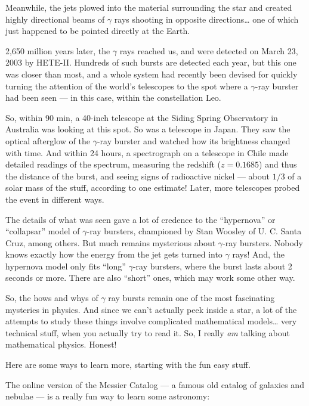 \documentclass{article}
\def\tightlist{}
\renewcommand{\texttt}[1]{%
  \begingroup
  \ttfamily
  \begingroup\lccode`~=`/\lowercase{\endgroup\def~}{/\discretionary{}{}{}}%
  \begingroup\lccode`~=`[\lowercase{\endgroup\def~}{[\discretionary{}{}{}}%
  \begingroup\lccode`~=`.\lowercase{\endgroup\def~}{.\discretionary{}{}{}}%
  \catcode`/=\active\catcode`[=\active\catcode`.=\active
  \scantokens{#1\noexpand}%
  \endgroup
}
\begin{document}
Meanwhile, the jets plowed into the material surrounding the star and
created highly directional beams of \(\gamma\) rays shooting in opposite
directions\ldots{} one of which just happened to be pointed directly at
the Earth.

2,650 million years later, the \(\gamma\) rays reached us, and were
detected on March 23, 2003 by HETE-II. Hundreds of such bursts are
detected each year, but this one was closer than most, and a whole
system had recently been devised for quickly turning the attention of
the world's telescopes to the spot where a \(\gamma\)-ray burster had
been seen --- in this case, within the constellation Leo.

So, within 90 min, a 40-inch telescope at the Siding Spring Observatory
in Australia was looking at this spot. So was a telescope in Japan. They
saw the optical afterglow of the \(\gamma\)-ray burster and watched how
its brightness changed with time. And within 24 hours, a spectrograph on
a telescope in Chile made detailed readings of the spectrum, measuring
the redshift (\(z = 0.1685\)) and thus the distance of the burst, and
seeing signs of radioactive nickel --- about \(1/3\) of a solar mass of
the stuff, according to one estimate! Later, more telescopes probed the
event in different ways.

The details of what was seen gave a lot of credence to the ``hypernova''
or ``collapsar'' model of \(\gamma\)-ray bursters, championed by Stan
Woosley of U. C. Santa Cruz, among others. But much remains mysterious
about \(\gamma\)-ray bursters. Nobody knows exactly how the energy from
the jet gets turned into \(\gamma\) rays! And, the hypernova model only
fits ``long'' \(\gamma\)-ray bursters, where the burst lasts about 2
seconds or more. There are also ``short'' ones, which may work some
other way.

So, the hows and whys of \(\gamma\) ray bursts remain one of the most
fascinating mysteries in physics. And since we can't actually peek
inside a star, a lot of the attempts to study these things involve
complicated mathematical models\ldots{} very technical stuff, when you
actually try to read it. So, I really \emph{am} talking about
mathematical physics. Honest!

Here are some ways to learn more, starting with the fun easy stuff.

The online version of the Messier Catalog --- a famous old catalog of
galaxies and nebulae --- is a really fun way to learn some astronomy:

\end{document}
